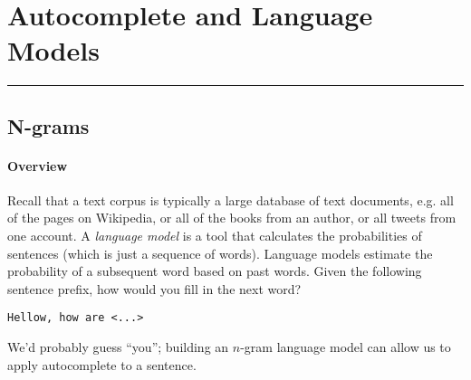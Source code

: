 \documentclass[12pt]{article}
\def\foldedpaper#1{
    \tikz[scale=#1,line width={#1*1pt}]{
        \def\a{1.41} %
        \def\b{0.2}  %
        \def\c{0.1}  %
        \def\d{0.05} %
        \def\N{6}    %
        \draw         (0,0)
                --  ++(-1,0)
                --  ++(0,\a)
                --  ++(1-\b,0)
                --  ++(\b,-\b)
                -- cycle;
        \foreach \lnum in {1,...,\N}{
            \pgfmathsetmacro\yline{\a-\d-\lnum*\a/(\N+1)}
            \draw (-1+\c,\yline) -- (-\c,\yline);
        }
        \draw[fill=white] (0,\a-\b) -- ++(-\b,0) -- ++ (0,\b);
    }
}
\begin{document}
\section{Autocomplete and Language Models}\vspace{.1pt} \hrule height 2pt \smallskip \renewcommand{\arraystretch}{1}%
\subsection{N-grams}
\paragraph{Overview} Recall that a text corpus is typically a large database of text documents, e.g. all of the pages on Wikipedia, or all of the books from an author, or all tweets from one account. A \emph{language model} is a tool that calculates the probabilities of sentences (which is just a sequence of words). Language models estimate the probability of a subsequent word based on past words. Given the following sentence prefix, how would you fill in the next word?

\begin{verbatim}
Hellow, how are <...>
\end{verbatim}

We'd probably guess ``you''; building an $n$-gram language model can allow us to apply autocomplete to a sentence.

\begin{figure}[h]
  \begin{center}
  \end{center}
\end{figure}
\end{document}
